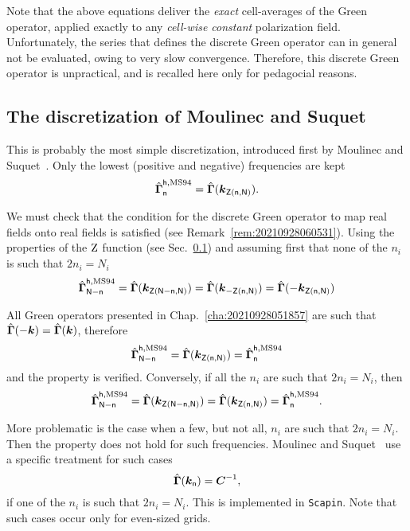 Note that the above equations deliver the \emph{exact} cell-averages of the
Green operator, applied exactly to any \emph{cell-wise constant} polarization
field. Unfortunately, the series that defines the discrete Green operator can in
general not be evaluated, owing to very slow convergence. Therefore, this
discrete Green operator is unpractical, and is recalled here only for pedagocial
reasons.

\subsection{The discretization of Moulinec and Suquet}

This is probably the most simple discretization, introduced first by Moulinec
and Suquet~\cite{moul1994, moul1998}. Only the lowest (positive and negative)
frequencies are kept
\begin{equation}
  \hat{\boldsymbol\Gamma}_{\mathsf n}^{\mathsf h, \mathrm{MS94}}=\hat{\boldsymbol\Gamma}
  (\boldsymbol k_{\mathsf Z(\mathsf n, \mathsf N)}).
\end{equation}

We must check that the condition for the discrete Green operator to map real
fields onto real fields is satisfied (see
Remark~\ref{rem:20210928060531}). Using the properties of the \(\operatorname{Z}\)
function (see Sec.~\ref{}) and assuming first that none of the \(n_i\) is such
that \(2n_i=N_i\)
\begin{equation}
  \hat{\boldsymbol\Gamma}_{\mathsf N-\mathsf n}^{\mathsf h, \mathrm{MS94}}
  =\hat{\boldsymbol\Gamma}(\boldsymbol k_{\mathsf Z(\mathsf N-\mathsf n, \mathsf N)})
  =\hat{\boldsymbol\Gamma}(\boldsymbol k_{-\mathsf Z(\mathsf n, \mathsf N)})
  =\hat{\boldsymbol\Gamma}(-\boldsymbol k_{\mathsf Z(\mathsf n, \mathsf N)})
\end{equation}

All Green operators presented in Chap.~\ref{cha:20210928051857} are such that
\(\hat{\boldsymbol\Gamma}(-\boldsymbol k)=\hat{\boldsymbol\Gamma}(\boldsymbol k)\), therefore
\begin{equation}
  \hat{\boldsymbol\Gamma}_{\mathsf N-\mathsf n}^{\mathsf h, \mathrm{MS94}}
  =\hat{\boldsymbol\Gamma}(\boldsymbol k_{\mathsf Z(\mathsf n, \mathsf N)})
  =\hat{\boldsymbol\Gamma}_{\mathsf n}^{\mathsf h, \mathrm{MS94}}
\end{equation}
and the property is verified. Conversely, if all the \(n_i\) are such that
\(2n_i=N_i\), then
\begin{equation}
  \hat{\boldsymbol\Gamma}_{\mathsf N-\mathsf n}^{\mathsf h, \mathrm{MS94}}
  =\hat{\boldsymbol\Gamma}(\boldsymbol k_{\mathsf Z(\mathsf N-\mathsf n, \mathsf N)})
  =\hat{\boldsymbol\Gamma}(\boldsymbol k_{\mathsf Z(\mathsf n, \mathsf N)})
  =\hat{\boldsymbol\Gamma}_{\mathsf n}^{\mathsf h, \mathrm{MS94}}.
\end{equation}

More problematic is the case when a few, but not all, \(n_i\) are such that
\(2n_i=N_i\). Then the property does not hold for such frequencies. Moulinec and
Suquet~\cite{moul1998} use a specific treatment for such cases
\begin{equation}
  \hat{\boldsymbol\Gamma}(\boldsymbol k_{\mathsf n})=\boldsymbol C^{-1},
\end{equation}
if one of the \(n_i\) is such that \(2n_i=N_i\). This is implemented in
\texttt{Scapin}. Note that such cases occur only for even-sized grids.
